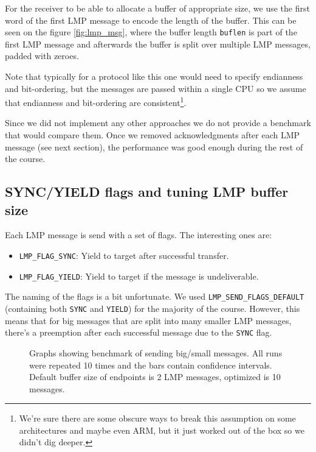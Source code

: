 For the receiver to be able to allocate a buffer of appropriate size, we use the first word of the first LMP
message to encode the length of the buffer. This can be seen on the figure \ref{fig:lmp_msg}, where the buffer length \texttt{buflen} is part of the first LMP message and afterwards the buffer is split over multiple LMP messages, padded with zeroes.

Note that typically for a protocol like this one would need to
specify endianness and bit-ordering, but the messages are passed within a single CPU so we assume that
endianness and bit-ordering are consistent\footnote{We're sure there are some obscure ways to break this assumption on some architectures and maybe even ARM, but it just worked out of the box so we didn't dig deeper.}.

Since we did not implement any other approaches we do not provide a benchmark that would compare them. Once we removed acknowledgments after each LMP message (see next section), the performance was good enough during the rest of the course.

\subsection{SYNC/YIELD flags and tuning LMP buffer size}
\label{sec:lmp_sync_and_buf}

Each LMP message is send with a set of flags. The interesting ones are:
\begin{itemize}
    \item \texttt{LMP_FLAG_SYNC}: Yield to target after successful transfer.
    \item \texttt{LMP_FLAG_YIELD}: Yield to target if the message is undeliverable.
\end{itemize}
The naming of the flags is a bit unfortunate. We used \texttt{LMP_SEND_FLAGS_DEFAULT} (containing both \texttt{SYNC} and \texttt{YIELD}) for the majority of the course. However, this means that for big messages that are split into many smaller LMP messages, there's a preemption after each successful message due to the \texttt{SYNC} flag. 

\begin{figure}[ht]
    \centering
         \subfloat[\centering ]{{\scalebox{0.35}{ }}}
         \subfloat[\centering ]{{\scalebox{0.35}{ }}}

    \caption{Graphs showing benchmark of sending big/small messages. All runs were repeated 10 times and the bars contain confidence intervals. Default buffer size of endpoints is 2 LMP messages, optimized is 10 messages.}
    \label{fig:lmp_bench}
\end{figure}


